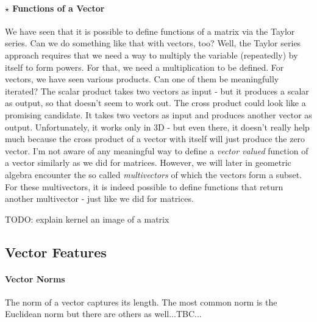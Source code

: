 \paragraph{$\star$ Functions of a Vector}
We have seen that it is possible to define functions of a matrix via the Taylor series. Can we do something like that with vectors, too? Well, the Taylor series approach requires that we need a way to multiply the variable (repeatedly) by itself to form powers. For that, we need a multiplication to be defined. For vectors, we have seen various products. Can one of them be meaningfully iterated? The scalar product takes two vectors as input - but it produces a scalar as output, so that doesn't seem to work out. The cross product could look like a promising candidate. It takes two vectors as input and produces another vector as output. Unfortunately, it works only in 3D - but even there, it doesn't really help much because the cross product of a vector with itself will just produce the zero vector. I'm not aware of any meaningful way to define a \emph{vector valued} function of a vector similarly as we did for matrices. However, we will later in geometric algebra encounter the so called \emph{multivectors} of which the vectors form a subset. For these multivectors, it is indeed possible to define functions that return another multivector - just like we did for matrices.

\medskip
TODO: explain kernel an image of a matrix







\subsection{Vector Features}

\paragraph{Vector Norms}
The norm of a vector captures its length. The most common norm is the Euclidean norm but there are others as well...TBC...


